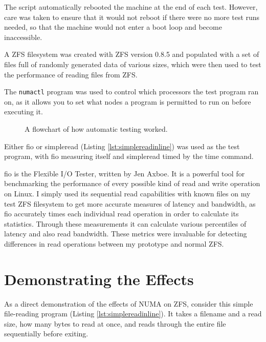 The script automatically rebooted the machine at the end of each test.
However, care was taken to ensure that it would not reboot if there were no more test runs needed, so that the machine
would not enter a boot loop and become inaccessible.

A ZFS filesystem was created with ZFS version 0.8.5 and populated with a set of files full of randomly generated data
of various sizes, which were then used to test the performance of reading files from ZFS.

The \texttt{numactl} program was used to control which processors the test program ran on, as it allows you to set what nodes a program is permitted
to run on before executing it.

\begin{figure}
    \centering
    \resizebox{!}{0.6\textheight}{}
    \captionsetup{width=0.75\linewidth}
    \caption{A flowchart of how automatic testing worked.}
    \label{fig:testflowchart}
\end{figure}

Either fio\cite{fio} or simpleread (Listing \ref{lst:simplereadinline}) was used as the test program, 
with fio measuring itself and simpleread timed by the time command.

fio is the Flexible I/O Tester, written by Jen Axboe\cite{fio}.
It is a powerful tool for benchmarking the performance of every possible kind of read and write operation on Linux.
I simply used its sequential read capabilities with known files on my test ZFS filesystem to get more accurate measures of
latency and bandwidth, as fio accurately times each individual read operation in order to calculate its statistics.
Through these measurements it can calculate various percentiles of latency and also read bandwidth. 
These metrics were invaluable for detecting differences in read operations between my prototype and normal ZFS.

\section{Demonstrating the Effects}
As a direct demonstration of the effects of NUMA on ZFS, consider this simple file-reading program (Listing \ref{lst:simplereadinline}).
It takes a filename and a read size, how many bytes to read at once, and reads through the entire file sequentially before exiting.

\singlespacing

\doublespacing


